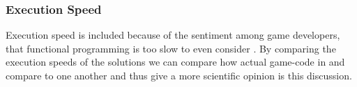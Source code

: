 \subsubsection{Execution Speed}
Execution speed is included because of the sentiment among game developers, that functional programming is too slow to even consider \cite{pop:functional:slow, pop:functional:sucks}. By comparing the execution speeds of the solutions we can compare how actual game-code in \csh and \fsh compare to one another and thus give a more scientific opinion is this discussion.
